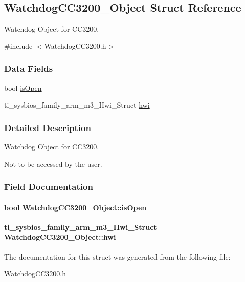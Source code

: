 \subsection{Watchdog\-C\-C3200\-\_\-\-Object Struct Reference}
\label{struct_watchdog_c_c3200___object}


Watchdog Object for C\-C3200.  




{\ttfamily \#include $<$Watchdog\-C\-C3200.\-h$>$}

\subsubsection*{Data Fields}
\begin{DoxyCompactItemize}
\item 
bool \hyperlink{struct_watchdog_c_c3200___object_a1fcac0aa0c5c81395da5ae4f0ae3d677}{is\-Open}
\item 
ti\-\_\-sysbios\-\_\-family\-\_\-arm\-\_\-m3\-\_\-\-Hwi\-\_\-\-Struct \hyperlink{struct_watchdog_c_c3200___object_ac05a4f0c7202edf003fb16cf5d1cf79f}{hwi}
\end{DoxyCompactItemize}


\subsubsection{Detailed Description}
Watchdog Object for C\-C3200. 

Not to be accessed by the user. 

\subsubsection{Field Documentation}
\paragraph[{is\-Open}]{\setlength{\rightskip}{0pt plus 5cm}bool Watchdog\-C\-C3200\-\_\-\-Object\-::is\-Open}\label{struct_watchdog_c_c3200___object_a1fcac0aa0c5c81395da5ae4f0ae3d677}
\paragraph[{hwi}]{\setlength{\rightskip}{0pt plus 5cm}ti\-\_\-sysbios\-\_\-family\-\_\-arm\-\_\-m3\-\_\-\-Hwi\-\_\-\-Struct Watchdog\-C\-C3200\-\_\-\-Object\-::hwi}\label{struct_watchdog_c_c3200___object_ac05a4f0c7202edf003fb16cf5d1cf79f}


The documentation for this struct was generated from the following file\-:\begin{DoxyCompactItemize}
\item 
\hyperlink{_watchdog_c_c3200_8h}{Watchdog\-C\-C3200.\-h}\end{DoxyCompactItemize}
